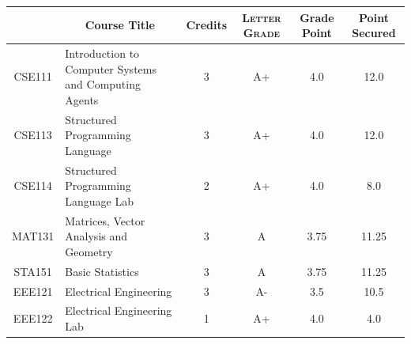 \documentclass[11pt]{article}
\newcommand*{\numtwo}[1]{\pgfmathprintnumber[
                    fixed, precision=2, fixed zerofill=true]{#1}}
\begin{document}
                \begin{center}
                    \renewcommand{\arraystretch}{1.08}
                    
                \begin{tabular}{|c|l|c|>{\scshape}c|c|c|}
                \hline  \rule[-1ex]{0pt}{3.5ex} {\centering{\bf Course Code}} &  \multicolumn{1}{c|}{\textbf{Course Title}}  & {\bf Credits} & {\bf Letter Grade} & {\bf Grade Point} & {\bf Point Secured}  \\ 
                \hline   CSE111 &  Introduction to Computer Systems and Computing Agents		 & 3 & A+ & 4.0 & 12.0 \\ %
                \hline   CSE113 &  Structured Programming Language		 & 3 & A+ & 4.0 & 12.0 \\ %
                \hline   CSE114 &  Structured Programming Language Lab		 & 2 & A+ & 4.0 & 8.0 \\ %
                \hline   MAT131 &  Matrices, Vector Analysis and Geometry		 & 3 & A & 3.75 & 11.25 \\ %
                \hline   STA151 &  Basic Statistics		 & 3 & A & 3.75 & 11.25 \\ %
                \hline   EEE121 &  Electrical Engineering		 & 3 & A- & 3.5 & 10.5 \\ %
                \hline   EEE122 &  Electrical Engineering Lab		 & 1 & A+ & 4.0 & 4.0 \\ %

\hline                %
                \end{tabular}
                \end{center}
                \renewcommand{\arraystretch}{1.03}
\end{document}
